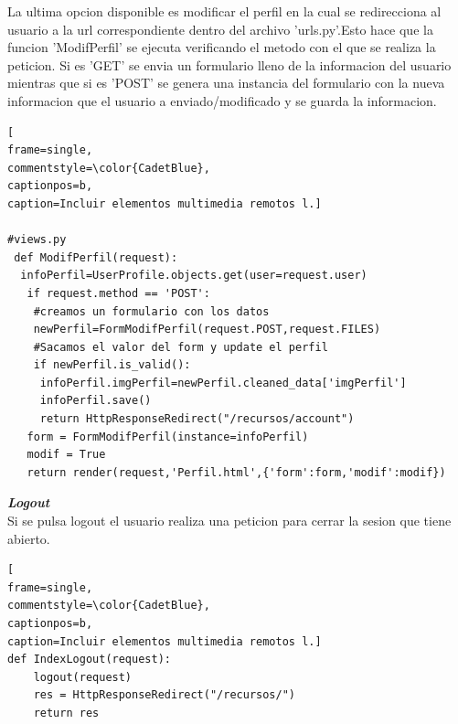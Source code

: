 La ultima opcion disponible es modificar el perfil en la cual se redirecciona al usuario a la url correspondiente dentro del archivo 'urls.py'.Esto hace que la funcion 'ModifPerfil' se ejecuta verificando el metodo con el que se realiza la peticion. Si es 'GET' se envia un formulario lleno de la informacion del usuario mientras que si es 'POST' se genera una instancia del formulario con la nueva informacion que el usuario a enviado/modificado  y se guarda la informacion.
\lstset{language=, breaklines=true, basicstyle=\footnotesize}
\begin{lstlisting}[
frame=single,
commentstyle=\color{CadetBlue},
captionpos=b,
caption=Incluir elementos multimedia remotos l.]

#views.py
 def ModifPerfil(request):
  infoPerfil=UserProfile.objects.get(user=request.user)
   if request.method == 'POST':
    #creamos un formulario con los datos
    newPerfil=FormModifPerfil(request.POST,request.FILES)
    #Sacamos el valor del form y update el perfil
    if newPerfil.is_valid():
     infoPerfil.imgPerfil=newPerfil.cleaned_data['imgPerfil']
     infoPerfil.save()
     return HttpResponseRedirect("/recursos/account")	
   form = FormModifPerfil(instance=infoPerfil)
   modif = True
   return render(request,'Perfil.html',{'form':form,'modif':modif})
\end{lstlisting}
\textbf{\textit{Logout}}
\\Si se pulsa logout el usuario realiza una peticion para cerrar la sesion que tiene abierto.
\lstset{language=, breaklines=true, basicstyle=\footnotesize}
\begin{lstlisting}[
frame=single,
commentstyle=\color{CadetBlue},
captionpos=b,
caption=Incluir elementos multimedia remotos l.]
def IndexLogout(request):
	logout(request)
	res = HttpResponseRedirect("/recursos/")
	return res
\end{lstlisting}
